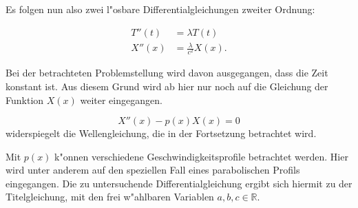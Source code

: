 Es folgen nun also zwei l"osbare Differentialgleichungen zweiter Ordnung:

\begin{align*}
	T''(t) &= \lambda T(t) \\
	X''(x) &= \frac{\lambda}{c^2}X(x).
\end{align*}

Bei der betrachteten Problemstellung wird davon ausgegangen, dass die 
Zeit konstant ist. Aus diesem Grund wird ab hier nur noch auf die Gleichung 
der Funktion $X(x)$ weiter eingegangen.

\begin{equation*}
	X''(x) - p(x) X(x) = 0
\end{equation*}
widerspiegelt die Wellengleichung, die in der Fortsetzung betrachtet wird.

Mit $p(x)$ k"onnen verschiedene Geschwindigkeitsprofile betrachtet werden. Hier 
wird unter anderem auf den speziellen Fall eines parabolischen Profils 
eingegangen. Die zu untersuchende Differentialgleichung ergibt sich hiermit zu 
der Titelgleichung, mit den frei w"ahlbaren Variablen ${a,b,c} \in \mathbb{R}$.